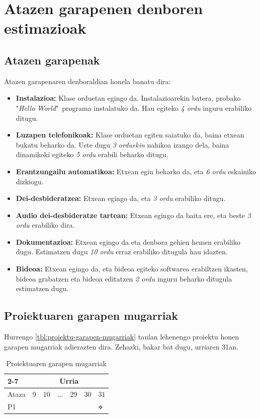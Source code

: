 \section{Atazen garapenen denboren estimazioak}

\subsection{Atazen garapenak}

Atazen garapenaren denboraldian honela banatu dira:
\begin{itemize}
    \item \textbf{Instalazioa:} Klase orduetan egingo da. Instalazioarekin batera, probako "\textit{Hello World}"\ programa instalatuko da. Hau egiteko \textit{4 ordu} inguru erabiliko ditugu.
    \item \textbf{Luzapen telefonikoak:} Klase orduetan egiten saiatuko da, baina etxean bukatu beharko da. Uste dugu \textit{3 orduekin} nahikoa izango dela, baina dinamikoki egiteko \textit{5 ordu} erabili beharko ditugu.
    \item \textbf{Erantzungailu automatikoa:} Etxean egin beharko da, eta \textit{6 ordu} eskainiko dizkiogu.
    \item \textbf{Dei-desbideratzea:} Etxean egingo da, eta \textit{3 ordu} erabiliko ditugu.
    \item \textbf{Audio dei-desbideratze tartean:} Etxean egingo da baita ere, eta beste \textit{3 ordu} erabiliko dira.
    \item \textbf{Dokumentazioa:} Etxean egingo da eta denbora gehien hemen erabiliko dugu. Estimatzen dugu \textit{10 ordu} erraz erabiliko ditugula hau idazten.
    \item \textbf{Bideoa:} Etxean egingo da, eta bideoa egiteko softwarea erabiltzen ikasten, bideoa grabatzen eta bideoa editatzen \textit{2 ordu} inguru beharko ditugula estimatzen dugu.
\end{itemize}

\subsection{Proiektuaren garapen mugarriak}

Hurrengo \autoref{tbl:proiektu-garapen-mugarriak} taulan lehenengo proiektu honen garapen mugarriak adierazten dira. Zehazki, bakar bat dugu, urriaren 31an.

\begin{table}[h!]
    \centering
    \begin{tabular}{l|llllll|}
        \cline{2-7}
                                    & \multicolumn{6}{c|}{Urria}  \\ \hline
        \multicolumn{1}{|l|}{Ataza} & 9 & 10 & ... & 29 & 30 & 31 \\ \hline
        \multicolumn{1}{|l|}{P1}    &   &    &     &    &    & ⋄  \\ \hline
    \end{tabular}
    \caption{Proiektuaren garapen mugarriak}
    \label{tbl:proiektu-garapen-mugarriak}
\end{table}

